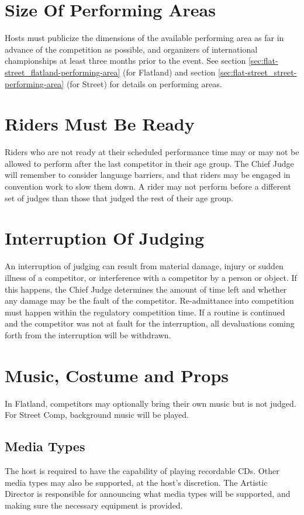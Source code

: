 \section{Size Of Performing Areas}
Hosts must publicize the dimensions of the available performing area as far in advance of the competition as possible, and organizers of international championships at least three months prior to the event. See section \ref{sec:flat-street_flatland-performing-area} (for Flatland) and section \ref{sec:flat-street_street-performing-area} (for Street) for details on performing areas.

\section{Riders Must Be Ready}
Riders who are not ready at their scheduled performance time may or may not be allowed to perform after the last competitor in their age group.
The Chief Judge will remember to consider language barriers, and that riders may be engaged in convention work to slow them down.
A rider may not perform before a different set of judges than those that judged the rest of their age group.

\section{Interruption Of Judging}
An interruption of judging can result from material damage, injury or sudden illness of a competitor, or interference with a competitor by a person or object.
If this happens, the Chief Judge determines the amount of time left and whether any damage may be the fault of the competitor.
Re-admittance into competition must happen within the regulatory competition time.
If a routine is continued and the competitor was not at fault for the interruption, all devaluations coming forth from the interruption will be withdrawn.

\section{Music, Costume and Props}
In Flatland, competitors may optionally bring their own music but is not judged.
For Street Comp, background music will be played.

\subsection{Media Types}
The host is required to have the capability of playing recordable CDs.
Other media types may also be supported, at the host's discretion.
The Artistic Director is responsible for announcing what media types will be supported, and making sure the necessary equipment is provided.

